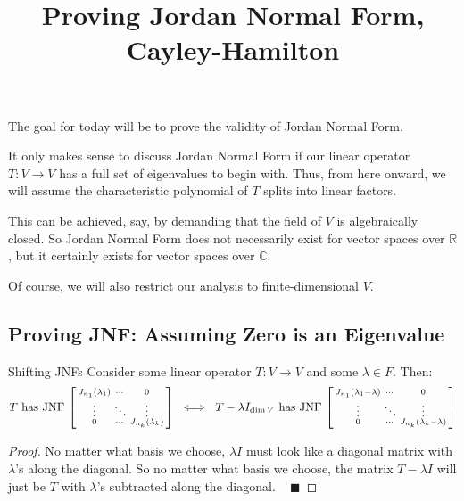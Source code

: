 \title{Proving Jordan Normal Form, Cayley-Hamilton}



The goal for today will be to prove the validity of Jordan Normal Form.

\begin{remark}
    It only makes sense to discuss Jordan Normal Form if our linear operator $T: V \to V$ has a full set of eigenvalues to begin with.  Thus, from here onward, we will assume the characteristic polynomial of $T$ splits into linear factors.
    
    This can be achieved, say, by demanding that the field of $V$ is algebraically closed.  So Jordan Normal Form does not necessarily exist for vector spaces over $\mathbb{R}$, but it certainly exists for vector spaces over $\mathbb{C}$.

    Of course, we will also restrict our analysis to finite-dimensional $V$.
\end{remark}

\subsection{Proving JNF: Assuming Zero is an Eigenvalue}

\begin{theorem}{Shifting JNFs}
    Consider some linear operator $T: V \to V$ and some $\lambda \in F$.  Then:
    \[ T \text{ has JNF } \begin{bsmallmatrix} J_{n_1}(\lambda_1) & \cdots & 0 \\ \vdots & \ddots & \vdots \\ 0 & \cdots & J_{n_k}(\lambda_k) \end{bsmallmatrix} ~ \iff ~ T - \lambda I_{\dim V} \text{ has JNF } \begin{bsmallmatrix} J_{n_1}(\lambda_1 - \lambda) & \cdots & 0 \\ \vdots & \ddots & \vdots \\ 0 & \cdots & J_{n_k}(\lambda_k - \lambda) \end{bsmallmatrix} \] \vspace{-0.3cm}
\end{theorem}

\begin{proof}
    No matter what basis we choose, $\lambda I$ must look like a diagonal matrix with $\lambda$'s along the diagonal.  So no matter what basis we choose, the matrix $T - \lambda I$ will just be $T$ with $\lambda$'s subtracted along the diagonal. ~ $\blacksquare$
\end{proof}

